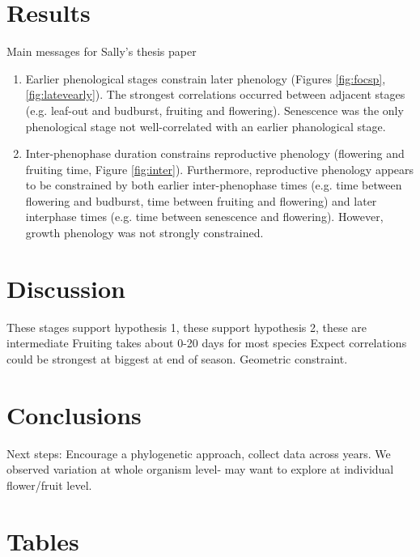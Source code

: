 \documentclass{article}
\begin{document}
\section* {Results}
Main messages for Sally's thesis paper
\begin{enumerate}
\item Earlier phenological stages constrain later phenology (Figures \ref{fig:focsp}, \ref{fig:latevearly}). The strongest correlations occurred between adjacent stages (e.g. leaf-out and budburst, fruiting and flowering). Senescence was the only phenological stage not well-correlated with an earlier phanological stage.
\item Inter-phenophase duration constrains reproductive phenology (flowering and fruiting time, Figure \ref{fig:inter}). Furthermore, reproductive phenology appears to be constrained by both earlier inter-phenophase times (e.g. time between flowering and budburst, time between fruiting and flowering) and later interphase times (e.g. time between senescence and flowering). However, growth phenology was not strongly constrained.

\end{enumerate}
\section* {Discussion}
These stages support hypothesis 1, these support hypothesis 2, these are intermediate
Fruiting takes about 0-20 days for most species
Expect correlations could be strongest  at biggest at end of season. Geometric constraint.
\section* {Conclusions}
Next steps: Encourage a phylogenetic approach, collect data across years. We observed variation at whole organism level- may want to explore at individual flower/fruit level. 

\section* {Tables}
\end{document}
